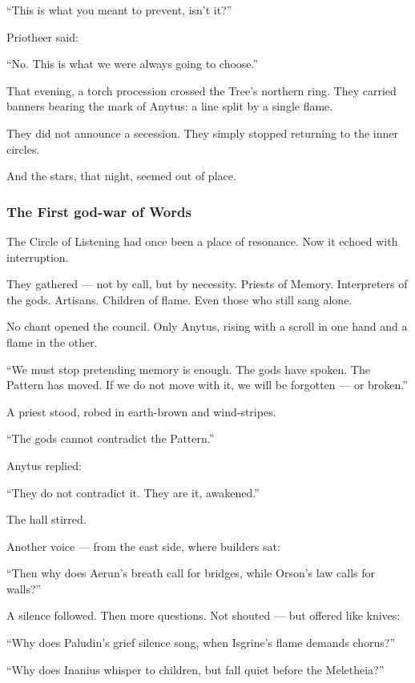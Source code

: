 \documentclass[12pt]{article}
\begin{document}
 “This is what you meant to prevent, isn’t it?”

Priotheer said:

 “No. This is what we were always going to choose.”

That evening, a torch procession crossed the Tree’s northern ring.  
They carried banners bearing the mark of Anytus:  
a line split by a single flame.

They did not announce a secession.  
They simply stopped returning to the inner circles.

And the stars, that night, seemed out of place.

\dotfill

\subsubsection{The First god-war of Words}

The Circle of Listening had once been a place of resonance.  
Now it echoed with interruption.

They gathered — not by call, but by necessity.  
Priests of Memory.  
Interpreters of the gods.  
Artisans. Children of flame.  
Even those who still sang alone.

No chant opened the council.  
Only Anytus, rising with a scroll in one hand and a flame in the other.

 “We must stop pretending memory is enough.  
 The gods have spoken.  
 The Pattern has moved.  
 If we do not move with it, we will be forgotten — or broken.”

A priest stood, robed in earth-brown and wind-stripes.

 “The gods cannot contradict the Pattern.”

Anytus replied:

 “They do not contradict it. They are it, awakened.”

The hall stirred.

Another voice — from the east side, where builders sat:

 “Then why does Aerun’s breath call for bridges,  
 while Orson’s law calls for walls?”

A silence followed.  
Then more questions.  
Not shouted — but offered like knives:

 “Why does Paludin’s grief silence song,  
 when Isgrine’s flame demands chorus?”

 “Why does Inanius whisper to children,  
 but fall quiet before the Meletheia?”
\end{document}
